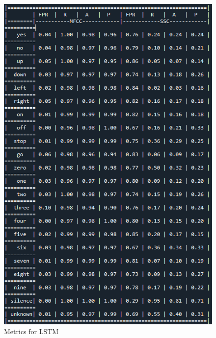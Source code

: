 \begin{appendices}
\begin{figure}[h!]
    \includegraphics[width=1\textwidth]{chapters/pictures/lstm_table.PNG}
    \caption{Metrics for LSTM}
    \label{fig:table_lstm}
\end{figure}
\newpage
\begin{figure}[h!]
    \centering

\end{figure}
\end{appendices}
